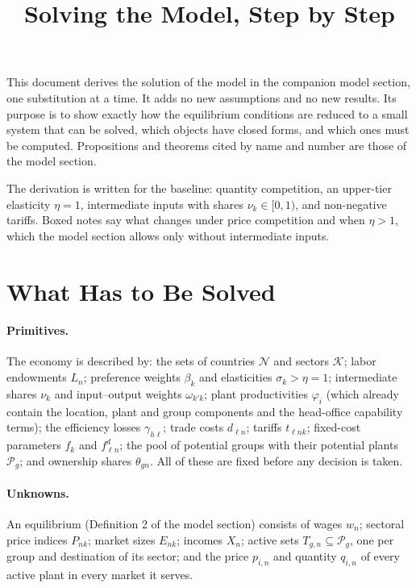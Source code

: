 \documentclass[11pt]{article}
\title{Solving the Model, Step by Step}
\author{}
\date{}
\theoremstyle{remark}
\newcommand{\cN}{\mathcal N}
\newcommand{\cK}{\mathcal K}
\newcommand{\cP}{\mathcal P}
\begin{document}
\maketitle

\noindent This document derives the solution of the model in the companion model
section, one substitution at a time. It adds no new assumptions and no new results.
Its purpose is to show exactly how the equilibrium conditions are reduced to a small
system that can be solved, which objects have closed forms, and which ones must be
computed. Propositions and theorems cited by name and number are those of the model
section.

The derivation is written for the baseline: quantity competition, an upper-tier
elasticity $\eta=1$, intermediate inputs with shares $\nu_k\in[0,1)$, and non-negative
tariffs. Boxed notes say what changes under price competition and when $\eta>1$, which
the model section allows only without intermediate inputs.

\tableofcontents

\setcounter{section}{-1}
\section{What Has to Be Solved}
\label{sec:overview}

\paragraph{Primitives.} The economy is described by: the sets of countries $\cN$ and
sectors $\cK$; labor endowments $L_n$; preference weights $\beta_k$ and elasticities
$\sigma_k>\eta=1$; intermediate shares $\nu_k$ and input--output weights
$\omega_{k'k}$; plant productivities $\varphi_i$ (which already contain the location,
plant and group components and the head-office capability terms); the efficiency
losses $\gamma_{h\ell}$; trade costs $d_{\ell n}$; tariffs $t_{\ell nk}$; fixed-cost
parameters $f_k$ and $f^d_{\ell n}$; the pool of potential groups with their potential
plants $\cP_g$; and ownership shares $\theta_{gn}$. All of these are fixed before any
decision is taken.

\paragraph{Unknowns.} An equilibrium (Definition 2 of the model section) consists of
wages $w_n$; sectoral price indices $P_{nk}$; market sizes $E_{nk}$; incomes $X_n$;
active sets $T_{g,n}\subseteq\cP_g$, one per group and destination of its sector; and
the price $p_{i,n}$ and quantity $q_{i,n}$ of every active plant in every market it
serves.
\end{document}
